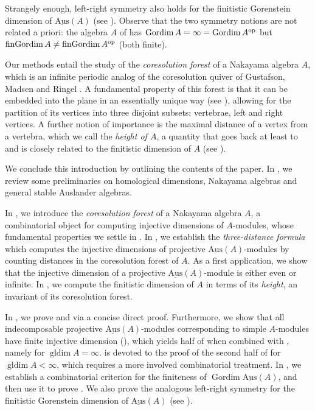 \documentclass[a4paper]{amsart}
\theoremstyle{definition}
\theoremstyle{remark}
\numberwithin{equation}{theorem}
\newcommand{\Dfn}[1]{\emph{\color{blue}#1}} %
\newcommand{\sAus}{\operatorname{\underline{Aus}}}
\newcommand{\gordim}{\operatorname{Gordim}}
\newcommand{\fingordim}{\operatorname{finGordim}}
\newcommand{\gldim}{\operatorname{gldim}}
\newcommand{\op}{\textnormal{op}}
\begin{document}
Strangely enough, left-right symmetry also holds for the finitistic Gorenstein dimension of $ \sAus(A) $ (see ).
Observe that the two symmetry notions are not related a priori:
the algebra $ A $ of 
has $ \gordim A = \infty = \gordim { A^\op } $ but $ \fingordim A \neq \fingordim { A^\op } $ (both finite).



Our methods entail the study of the \Dfn{coresolution forest} of a Nakayama algebra $ A $, which is an infinite periodic analog of the coresolution quiver of Gustafson, Madsen
and Ringel \cite{G,Ma,Ri1,Ri2}.
A fundamental property of this forest is that it can be embedded into the plane in an essentially unique way (see ), allowing for the partition of its vertices into three disjoint subsets: vertebrae, left and right vertices. A further notion of importance is the maximal distance of a vertex from a vertebra, which we call the \Dfn{height of $ A $}, a quantity that goes back at least to \cite{G} and is closely related to the finitistic dimension of $ A $ (see ).



We conclude this introduction by outlining the contents of the paper.
In , we review some preliminaries on homological dimensions, Nakayama algebras and general stable Auslander algebras.


In , we introduce the \emph{coresolution forest} of a Nakayama algebra $ A $, a combinatorial object for computing injective dimensions of $ A $-modules, whose fundamental properties we settle in . In , we establish the \emph{three-distance formula} which computes the injective dimensions of projective $ \sAus(A) $-modules by counting distances in the coresolution forest of $ A $. As a first application, we show that the injective dimension of a projective $ \sAus(A) $-module is either even or infinite. In , we compute the finitistic dimension of $ A $ in terms of its \emph{height}, an invariant of its coresolution forest.

In , we prove  and  via a concise direct proof. Furthermore, we show that all indecomposable projective $ \sAus(A) $-modules corresponding to simple $ A $-modules have finite injective dimension (), which yields half of  when combined with , namely for $ \gldim A = \infty $.  is devoted to the proof of the second half of  for $ \gldim A < \infty $, which requires a more involved combinatorial treatment. In , we establish a combinatorial criterion for the finiteness of $ \gordim \sAus(A) $, and then use it to prove . We also prove the analogous left-right symmetry for the finitistic Gorenstein dimension of $ \sAus(A) $ (see ).
\end{document}
